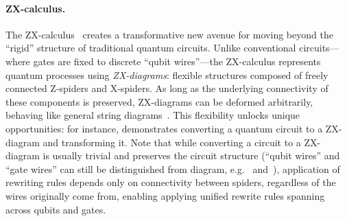 \documentclass[a4paper,onecolumn,11pt,unpublished]{quantumarticle}
\begin{document}
\paragraph{ZX-calculus.} The ZX-calculus~\cite{weteringZXcalculusWorkingQuantum2020} creates a transformative new avenue for moving beyond the ``rigid'' structure of traditional quantum circuits. Unlike conventional circuits---where gates are fixed to discrete ``qubit wires''---the ZX-calculus represents quantum processes using \textit{ZX-diagrams}: flexible structures composed of freely connected Z-spiders and X-spiders. As long as the underlying connectivity of these components is preserved, ZX-diagrams can be deformed arbitrarily, behaving like general string diagrams~\cite{coeckePicturingQuantumProcesses2017}. This flexibility unlocks unique opportunities: for instance,  demonstrates converting a quantum circuit to a ZX-diagram and transforming it. Note that while converting a circuit to a ZX-diagram is usually trivial and preserves the circuit structure (``qubit wires'' and ``gate wires'' can still be distinguished from diagram, e.g.~ and~), application of rewriting rules depends only on connectivity between spiders, regardless of the wires originally come from, enabling applying unified rewrite rules spanning across qubits and gates.
\end{document}
